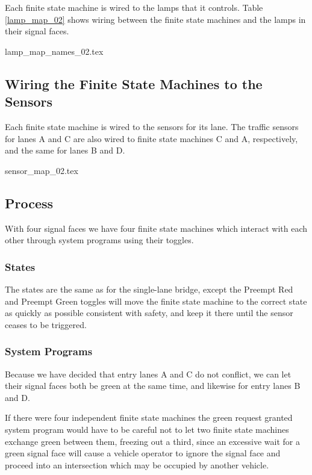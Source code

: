 \documentclass[letterpaper,twoside]{article}
\begin{document}
Each finite state machine is wired to the lamps that
it controls.  Table \ref{lamp_map_02} shows wiring between the
finite state machines and the lamps in their signal faces.

 {lamp_map_names_02.tex}

\subsection{Wiring the Finite State Machines to the Sensors}

Each finite state machine is wired to the sensors
for its lane.  The traffic sensors for lanes A and C
are also wired to finite state machines C and A, respectively, and
the same for lanes B and D.

 {sensor_map_02.tex}

\subsection{Process}

With four signal faces we have four finite state machines which
interact with each other through system programs using their
toggles.

\subsubsection{States}

The states are the same as for the single-lane bridge,
except the Preempt Red and Preempt Green toggles will move the
finite state machine
to the correct state as quickly as possible consistent with
safety, and keep it there until the sensor ceases to be triggered.

\subsubsection{System Programs}

Because we have decided that entry lanes A and C do not conflict,
we can let their signal faces both be green at the same time, and likewise for
entry lanes B and D.

If there were four independent finite state machines the green request granted
system program would have to  be careful not to let two finite state machines
exchange green between them, freezing out a third, since an excessive
wait for a green signal face will cause a vehicle operator to ignore the
signal face and proceed into an intersection which may be occupied by
another vehicle.
\end{document}
